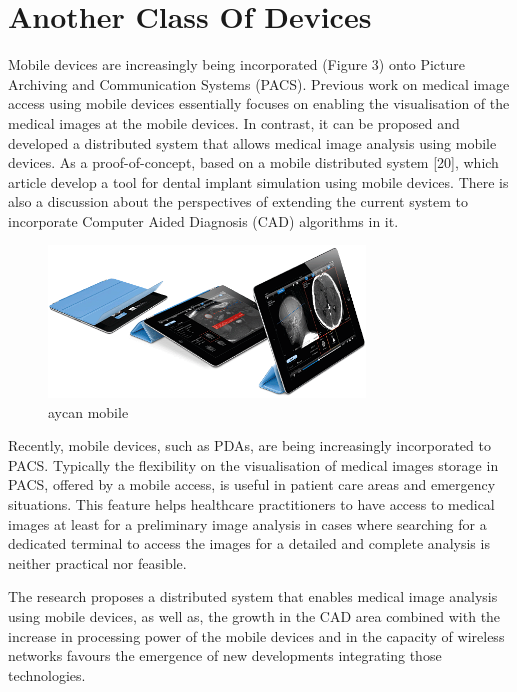 \section{Another Class Of Devices}

Mobile devices are increasingly being incorporated (Figure 3) onto Picture Archiving and Communication Systems (PACS). Previous work on medical image access using mobile devices essentially focuses on enabling the visualisation of the medical images at the mobile devices. In contrast, it can be proposed and developed a distributed system that allows medical image analysis using mobile devices. As a proof-of-concept, based on a mobile distributed system [20], which article develop a tool for dental implant simulation using mobile devices. There is also a discussion about the perspectives of extending the current system to incorporate Computer Aided Diagnosis (CAD) algorithms in it.

\begin{figure}[!hbt]
\centering
\includegraphics[width=0.75\textwidth]{mobile.png}
\caption{\label{fig:frog}aycan mobile
}
\end{figure}

Recently, mobile devices, such as PDAs, are being increasingly incorporated to PACS. Typically the flexibility on the visualisation of medical images storage in PACS, offered by a mobile access, is useful in patient care areas and emergency situations. This feature helps healthcare practitioners to have access to medical images at least for a preliminary image analysis in cases where searching for a dedicated terminal to access the images for a detailed and complete analysis is neither practical nor feasible.

The research proposes a distributed system that enables medical image analysis using mobile devices, as well as, the growth in the CAD area combined with the increase in processing power of the mobile devices and in the capacity of wireless networks favours the emergence of new developments integrating those technologies.

